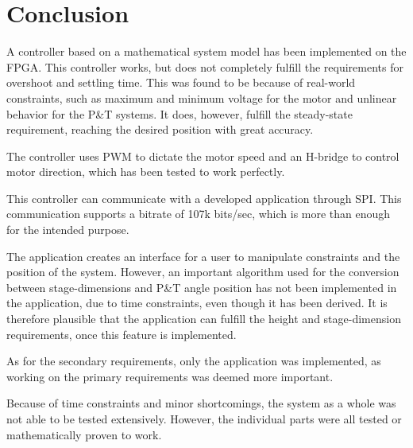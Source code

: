 \section{Conclusion}
A controller based on a mathematical system model has been implemented on the FPGA. This controller works, but does not completely fulfill the requirements for overshoot and settling time. This was found to be because of real-world constraints, such as maximum and minimum voltage for the motor and unlinear behavior for the P\&T systems. It does, however, fulfill the steady-state requirement, reaching the desired position with great accuracy.

The controller uses PWM to dictate the motor speed and an H-bridge to control motor direction, which has been tested to work perfectly.

This controller can communicate with a developed application through SPI. This communication supports a bitrate of 107k bits/sec, which is more than enough for the intended purpose.

The application creates an interface for a user to manipulate constraints and the position of the system. However, an important algorithm used for the conversion between stage-dimensions and P\&T angle position has not been implemented in the application, due to time constraints, even though it has been derived. It is therefore plausible that the application can fulfill the height and stage-dimension requirements, once this feature is implemented.

As for the secondary requirements, only the application was implemented, as working on the primary requirements was deemed more important.

Because of time constraints and minor shortcomings, the system as a whole was not able to be tested extensively. However, the individual parts were all tested or mathematically proven to work.